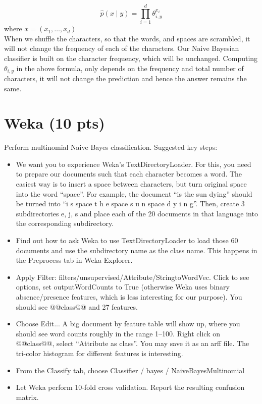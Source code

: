 \documentclass[a4paper]{article}
\theoremstyle{definition}
\newenvironment{soln}{
    \leavevmode\color{blue}\ignorespaces
}{}
\begin{document}
\begin{enumerate}
\begin{soln}
$$\hat p(x \mid y) = \prod_{i=1}^d \theta_{i, y}^{x_i}$$
where $x=(x_1, \ldots, x_d)$\\

When we shuffle the characters, so that the words, and spaces are scrambled, it will not change the frequency of each of the characters. Our Naive Bayesian classifier is built on the character frequency, which will be unchanged. Computing $\theta_{i, y}$ in the above formula, only depends on the frequency and total number of characters, it will not change the prediction and hence the answer remains the same.

\end{soln}

\end{enumerate}

\section{Weka (10 pts)}
Perform multinomial Naive Bayes classification.  Suggested key steps:
\begin{itemize}
\item We want you to experience Weka's TextDirectoryLoader.  For this, you need to prepare our documents such that each character becomes a word.  The easiest way is to insert a space between characters, but turn original space into the word ``space''.  For example, the document ``is the sun dying'' should be turned into ``i s space t h e space s u n space d y i n g''.
Then, create 3 subdirectories e, j, s and place each of the 20 documents in that language into the corresponding subdirectory.  
\item Find out how to ask Weka to use TextDirectoryLoader to load those 60 documents and use the subdirectory name as the class name.  This happens in the Preprocess tab in Weka Explorer.
\item Apply Filter: filters/unsupervised/Attribute/StringtoWordVec. Click to see options, set outputWordCounts to True (otherwise Weka uses binary absence/presence features, which is less interesting for our purpose). You should see @@class@@ and 27 features.
\item Choose Edit...  A big document by feature table will show up, where you should see word counts roughly in the range 1--100.  Right click on @@class@@, select ``Attribute as class''.  You may save it as an arff file.
The tri-color histogram for different features is interesting.
\item From the Classify tab, choose Classifier / bayes / NaiveBayesMultinomial
\item Let Weka perform 10-fold cross validation.  Report the resulting confusion matrix.
\end{itemize}
\end{document}

